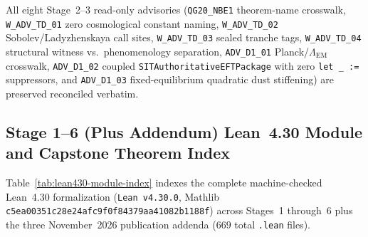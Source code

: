 All eight Stage~2--3 read-only advisories (\texttt{QG20\_NBE1} theorem-name crosswalk, \texttt{W\_ADV\_TD\_01} zero cosmological constant naming, \texttt{W\_ADV\_TD\_02} Sobolev/Ladyzhenskaya call sites, \texttt{W\_ADV\_TD\_03} sealed tranche tags, \texttt{W\_ADV\_TD\_04} structural witness vs.\ phenomenology separation, \texttt{ADV\_D1\_01} Planck/$\Lambda_{\mathrm{EM}}$ crosswalk, \texttt{ADV\_D1\_02} coupled \texttt{SITAuthoritative\allowbreak{}EFTPackage} with zero \texttt{let \_ :=} suppressors, and \texttt{ADV\_D1\_03} fixed-equilibrium quadratic dust stiffening) are preserved reconciled verbatim.

\subsection{Stage 1--6 (Plus Addendum) Lean~4.30 Module and Capstone Theorem Index}

Table~\ref{tab:lean430-module-index} indexes the complete machine-checked Lean~4.30 formalization (\texttt{Lean v4.30.0}, Mathlib \texttt{c5ea00351c28e24afc9f0f84379aa41082b1188f}) across Stages~1 through~6 plus the three November~2026 publication addenda ($669$ total \texttt{.lean} files).

